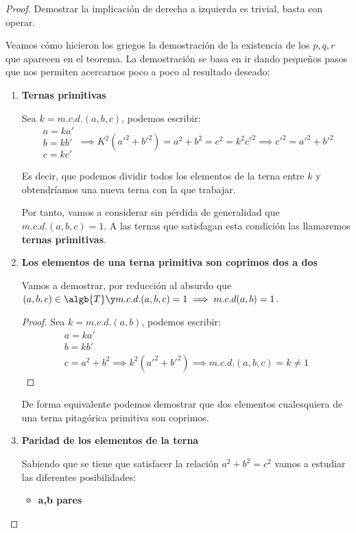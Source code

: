 \documentclass{apuntes}
\begin{document}
\begin{proof}
Demostrar la implicación de derecha a izquierda es trivial, basta con operar.

Veamos cómo hicieron los griegos la demostración de la existencia de los $p,q,r$ que aparecen en el teorema. La demostración se basa en ir dando pequeños pasos que nos permiten acercarnos poco a poco al resultado deseado:

\begin{enumerate}
\item \textbf{Ternas primitivas}

Sea $k=m.c.d.(a,b,c)$, podemos escribir:
\[\begin{array}{l} a=ka' \\ b=kb' \\ c=kc' \end{array}  \implies K^2(a'^2+b'^2)=a^2+b^2 = c^2=k^2c'^2 \implies c'^2=a'^2+b'^2\]

Es decir, que podemos dividir todos los elementos de la terna entre $k$ y obtendríamos una nueva terna con la que trabajar.

Por tanto, vamos a considerar sin pérdida de generalidad que $m.c.d.(a,b,c) = 1$. A las ternas que satisfagan esta condición las llamaremos \textbf{ternas primitivas}.

\item \textbf{Los elementos de una terna primitiva son coprimos dos a dos}

Vamos a demostrar, por reducción al absurdo que $(a,b,c) \in \algb{T} \y m.c.d.(a,b,c)=1 \implies m.c.d(a,b)=1$.
\begin{proof}
Sea $k=m.c.d.(a,b)$, podemos escribir:
\[\begin{array}{l} a=ka' \\ b=kb' \\ c=a^2+b^2 \implies k^2(a'^2+b'^2) \implies m.c.d.(a,b,c)=k \neq 1 \end{array}\]
\end{proof}

De forma equivalente podemos demostrar que dos elementos cualesquiera de una terna pitagórica primitiva son coprimos.

\item \textbf{Paridad de los elementos de la terna}

Sabiendo que se tiene que satisfacer la relación $a^2+b^2=c^2$ vamos a estudiar las diferentes posibilidades:

\begin{itemize}
\item \textbf{a,b pares}


\end{itemize}
\end{enumerate}
\end{proof}
\end{document}
